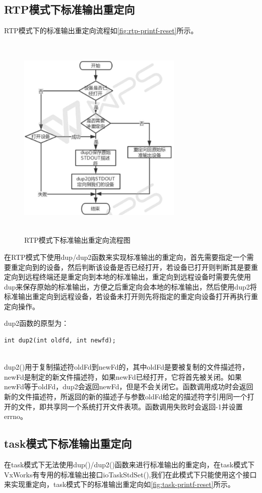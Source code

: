 \subsection{RTP模式下标准输出重定向}
	RTP模式下的标准输出重定向流程如\autoref{fig:rtp-printf-reset}所示。
\begin{figure}[!h]
\centering
\includegraphics[width=0.7\textwidth , height=10cm]{./graphics/RTP-STDOUT-RESET.pdf}
\caption{RTP模式下标准输出重定向流程图}\label{fig:rtp-printf-reset}
\end{figure}


在RTP模式下使用dup/dup2函数来实现标准输出的重定向，首先需要指定一个需要重定向到的设备，然后判断该设备是否已经打开，若设备已打开则判断其是要重定向到远程终端还是重定向到本地的标准输出，重定向到远程设备时需要先使用dup来保存原始的标准输出，方便之后重定向会本地的标准输出，然后使用dup2将标准输出重定向到远程设备，若设备未打开则先将指定的重定向设备打开再执行重定向操作。

dup2函数的原型为：
\lstset{language=C}
\begin{lstlisting}
int dup2(int oldfd, int newfd);
\end{lstlisting}\\
dup2()用于复制描述符oldFd到newFd的，其中oldFd是要被复制的文件描述符，newFd是制定的新文件描述符，如果newFd已经打开，它将首先被关闭。如果newFd等于oldFd，dup2会返回newFd，但是不会关闭它。函数调用成功时会返回新的文件描述符，所返回的新的描述子与参数oldFd给定的描述符字引用同一个打开的文件，即共享同一个系统打开文件表项。函数调用失败时会返回-1并设置errno。

\subsection{task模式下标准输出重定向}
在task模式下无法使用dup()/dup2()函数来进行标准输出的重定向，在task模式下VxWorks有专用的标准输出接口ioTaskStdSet(),我们在此模式下只能使用这个接口来实现重定向，task模式下的标准输出重定向如\autoref{fig:task-printf-reset}所示。

